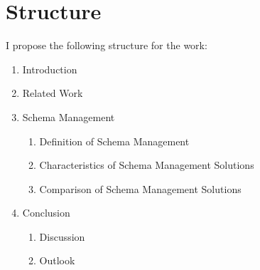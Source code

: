 
\section{Structure}\label{sec:structure}

I propose the following structure for the work:

\begin{enumerate}
  \item Introduction
  \item Related Work
  \item Schema Management
  \begin{enumerate}
    \item Definition of Schema Management
    \item Characteristics of Schema Management Solutions
    \item Comparison of Schema Management Solutions
  \end{enumerate}
  \item Conclusion
  \begin{enumerate}
    \item Discussion
    \item Outlook
  \end{enumerate}
\end{enumerate}